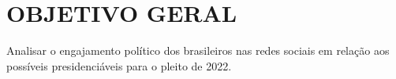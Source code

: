 \section{OBJETIVO GERAL}
\label{sec:objetivo_geral}

Analisar o engajamento político dos brasileiros nas redes sociais em relação aos possíveis presidenciáveis para o pleito de 2022.
